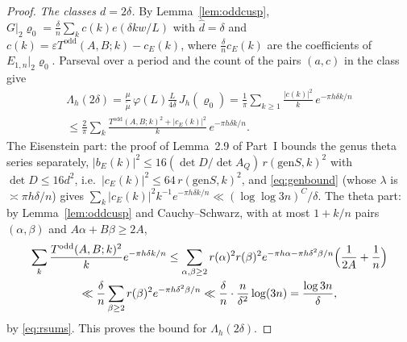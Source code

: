 ﻿\documentclass[11pt]{amsart}
\theoremstyle{remark}
\newcommand{\e}{\varepsilon}
\newcommand{\gen}{\mathrm{gen}}
\newcommand{\rk}{r}
\begin{document}
\begin{proof}
\emph{The classes $d=2\delta$.} By Lemma~\ref{lem:oddcusp}, $G|_2\varrho_0=\frac\delta n\sum_kc(k)e(\delta kw/L)$ with $\hat d=\delta$ and $c(k)=\e T^{\mathrm{odd}}(A,B;k)-c_E(k)$, where $\frac\delta nc_E(k)$ are the coefficients of $E_{1,n}|_2\varrho_0$. Parseval over a period and the count of the pairs $(a,c)$ in the class give
\begin{multline*}
\Lambda_h(2\delta)=\frac\mu{\tilde\mu}\,\varphi(L)\frac L{4\delta}\,J_h(\varrho_0)=\frac1\pi\sum_{k\ge1}\frac{|c(k)|^2}k\,e^{-\pi h\delta k/n}\\
\le\frac2\pi\sum_k\frac{T^{\mathrm{odd}}(A,B;k)^2+|c_E(k)|^2}k\,e^{-\pi h\delta k/n}.
\end{multline*}
The Eisenstein part: the proof of Lemma~2.9 of Part~I bounds the genus theta series separately, $|b_E(k)|^2\le16(\det D/\det A_Q)\,\rk(\gen S,k)^2$ with $\det D\le16d^2$, i.e.\ $|c_E(k)|^2\le64\,\rk(\gen S,k)^2$, and \eqref{eq:genbound} (whose $\lambda$ is $\asymp\pi h\delta/n$) gives $\sum_k|c_E(k)|^2k^{-1}e^{-\pi h\delta k/n}\ll(\log\log3n)^{C}/\delta$. The theta part: by Lemma~\ref{lem:oddcusp} and Cauchy--Schwarz, with at most $1+k/n$ pairs $(\alpha,\beta)$ and $A\alpha+B\beta\ge2A$,
\begin{multline*}
\sum_k\frac{T^{\mathrm{odd}}(A,B;k)^2}ke^{-\pi h\delta k/n}\le\sum_{\alpha,\beta\ge2}r(\alpha)^2r(\beta)^2e^{-\pi h\alpha-\pi h\delta^2\beta/n}\Bigl(\frac1{2A}+\frac1n\Bigr)\\
\ll\frac\delta n\sum_{\beta\ge2}r(\beta)^2e^{-\pi h\delta^2\beta/n}\ll\frac\delta n\cdot\frac n{\delta^2}\log(3n)=\frac{\log3n}\delta ,
\end{multline*}
by \eqref{eq:rsums}. This proves the bound for $\Lambda_h(2\delta)$.
\end{proof}
\end{document}
